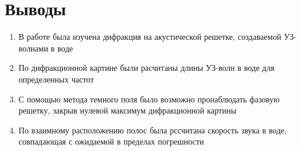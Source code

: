 \documentclass[a4paper, 12pt]{article}
\begin{document}
 \section{Выводы}
\begin{enumerate}
    \item В работе была изучена дифракция на акустической решетке, создаваемой УЗ-волнами в воде
    \item По дифракционной картине были расчитаны длины УЗ-волн в воде для определенных частот
    \item С помощью метода темного поля было возможно пронаблюдать фазовую решетку, закрыв нулевой максимум дифракционной картины
    \item По взаимному расположению полос была рссчитана скорость звука в воде, совпадающая с ожидаемой в пределах погрешности

\end{enumerate}
\end{document}
